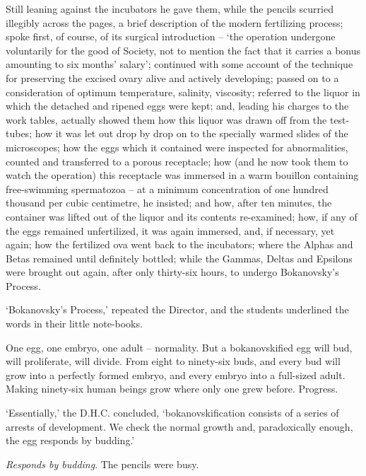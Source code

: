 \documentclass[12pt,a5paper]{book}
\newcommand{\sqm}[1]{‘#1’}
\begin{document}
Still leaning against the incubators he gave them, while the pencils scurried illegibly across the pages, a brief description of the modern fertilizing process; spoke first, of course, of its surgical introduction – \sqm{the operation undergone voluntarily for the good of Society, not to mention the fact that it carries a bonus amounting to six months' salary}; continued with some account of the technique for preserving the excised ovary alive and actively developing; passed on to a consideration of optimum temperature, salinity, viscosity; referred to the liquor in which the detached and ripened eggs were kept; and, leading his charges to the work tables, actually showed them how this liquor was drawn off from the test-tubes; how it was let out drop by drop on to the specially warmed slides of the microscopes; how the eggs which it contained were inspected for abnormalities, counted and transferred to a porous receptacle; how (and he now took them to watch the operation) this receptacle was immersed in a warm bouillon containing free-swimming spermatozoa – at a minimum concentration of one hundred thousand per cubic centimetre, he insisted; and how, after ten minutes, the container was lifted out of the liquor and its contents re-examined; how, if any of the eggs remained unfertilized, it was again immersed, and, if necessary, yet again; how the fertilized ova went back to the incubators; where the Alphas and Betas remained until definitely bottled; while the Gammas, Deltas and Epsilons were brought out again, after only thirty-six hours, to undergo Bokanovsky's Process.

\sqm{Bokanovsky's Process,} repeated the Director, and the students underlined the words in their little note-books.

One egg, one embryo, one adult – normality. But a bokanovskified egg will bud, will proliferate, will divide. From eight to ninety-six buds, and every bud will grow into a perfectly formed embryo, and every embryo into a full-sized adult. Making ninety-six human beings grow where only one grew before. Progress.

\sqm{Essentially,} the D.H.C. concluded, \sqm{bokanovskification consists of a series of arrests of development. We check the normal growth and, paradoxically enough, the egg responds by budding.}

\emph{Responds by budding}. The pencils were busy.
\end{document}
